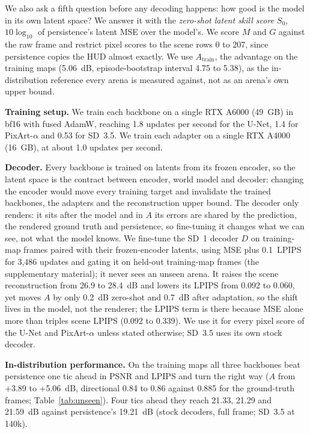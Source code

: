 \documentclass{article}
\newif\ifdraftmarks \draftmarkstrue
\newif\ifwithappendix \withappendixfalse %
\newcommand{\appref}[1]{\ifwithappendix Appendix~\ref{#1}\else the supplementary material\fi}
\newcommand{\prov}[1]{\ifdraftmarks\textcolor[rgb]{0,0.3,0.75}{#1}\else#1\fi}
\begin{document}
We also ask a fifth question before any decoding happens: how good is the model in its own latent space? We answer it with the \emph{zero-shot latent skill score} $S_0$, $10\log_{10}$ of persistence's latent MSE over the model's. We score $M$ and $G$ against the raw frame and restrict pixel scores to the scene rows 0 to 207, since persistence copies the HUD almost exactly. We use $A_\text{train}$, the advantage on the training maps (5.06~dB, episode-bootstrap interval 4.75 to 5.38), as the in-distribution reference every arena is measured against, not as an arena's own upper bound.

\textbf{Training setup.} We train each backbone on a single RTX A6000 (49~GB) in bf16 with fused AdamW, reaching 1.8 updates per second for the U-Net, 1.4 for PixArt-$\alpha$ and 0.53 for SD~3.5. We train each adapter on a single RTX A4000 (16~GB), at about 1.0 updates per second.


\textbf{Decoder.} Every backbone is trained on latents from its frozen encoder, so the latent space is the contract between encoder, world model and decoder: changing the encoder would move every training target and invalidate the trained backbones, the adapters and the reconstruction upper bound.
The decoder only renders: it sits after the model and in $A$ its errors are shared by the prediction, the rendered ground truth and persistence, so fine-tuning it changes what we can see, not what the model knows.
We fine-tune the SD~1 decoder $D$ on training-map frames paired with their frozen-encoder latents, using MSE plus 0.1~LPIPS for 3,486 updates and gating it on held-out training-map frames (\appref{app:protocol}); it never sees an unseen arena.
It raises the scene reconstruction from 26.9 to 28.4~dB and lowers its LPIPS from 0.092 to 0.060, yet moves $A$ by only 0.2~dB zero-shot and 0.7~dB after adaptation, so the shift lives in the model, not the renderer; the LPIPS term is there because MSE alone more than triples scene LPIPS (0.092 to 0.339).
We use it for every pixel score of the U-Net and PixArt-$\alpha$ unless stated otherwise; SD~3.5 uses its own stock decoder.

\textbf{In-distribution performance.} On the training maps all three backbones beat persistence one tic ahead in PSNR and LPIPS and turn the right way ($A$ from \prov{+3.89} to +5.06~dB, directional 0.84 to 0.86 against 0.885 for the ground-truth frames; Table~\ref{tab:unseen}).
Four tics ahead they reach 21.33, 21.29 and \prov{21.59}~dB against persistence's 19.21~dB (stock decoders, full frame; SD~3.5 at 140k).
\end{document}
